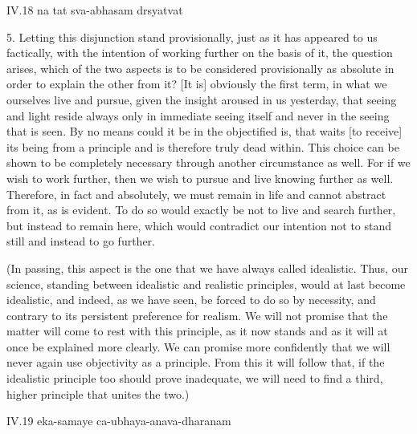 IV.18
na tat sva-abhasam drsyatvat

5. Letting this disjunction stand provisionally,
just as it has appeared to us factically,
with the intention of working further
on the basis of it, the question arises,
which of the two aspects is to be
considered provisionally as absolute
in order to explain the other from it?
[It is] obviously the first term,
in what we ourselves live and pursue,
given the insight aroused in us yesterday,
that seeing and light reside always
only in immediate seeing itself and
never in the seeing that is seen.
By no means could it be in the objectified is,
that waits [to receive] its being from a principle
and is therefore truly dead within.
This choice can be shown to be completely necessary
through another circumstance as well.
For if we wish to work further,
then we wish to pursue and live knowing further as well.
Therefore, in fact and absolutely, we must remain in life
and cannot abstract from it, as is evident.
To do so would exactly be not to live and search further,
but instead to remain here,
which would contradict our intention
not to stand still and instead to go further.

(In passing, this aspect is the one
that we have always called idealistic.
Thus, our science, standing between
idealistic and realistic principles,
would at last become idealistic,
and indeed, as we have seen,
be forced to do so by necessity,
and contrary to its persistent
preference for realism.
We will not promise that the matter
will come to rest with this principle,
as it now stands and as it will
at once be explained more clearly.
We can promise more confidently that
we will never again use objectivity as a principle.
From this it will follow that,
if the idealistic principle too
should prove inadequate,
we will need to find a third, higher principle
that unites the two.)

IV.19
eka-samaye ca-ubhaya-anava-dharanam

